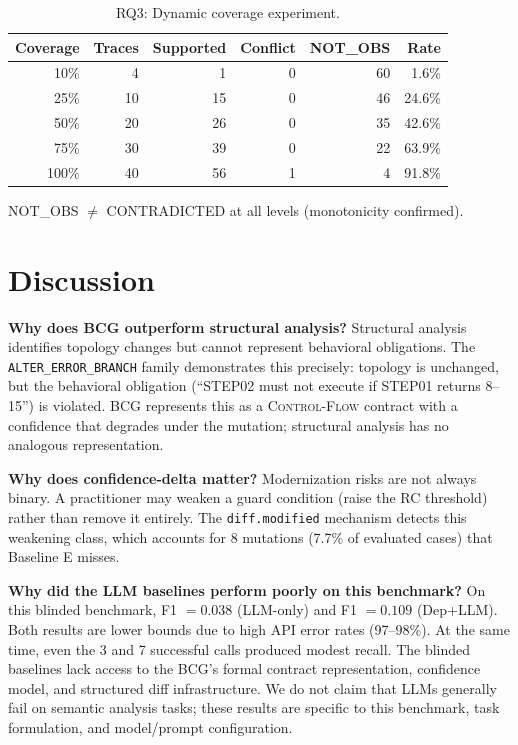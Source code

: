 \documentclass[sigconf,anonymous,review]{acmart}
\newcommand{\bcg}{\textsc{BCG}\xspace}
\begin{document}
\begin{table}[t]
\small\centering
\caption{RQ3: Dynamic coverage experiment.}\label{table:coverage}
\begin{tabular}{rrrrrr}
\toprule
Coverage & Traces & Supported & Conflict & NOT\_OBS & Rate \\
\midrule
10\%  & 4  & 1  & 0 & 60 & 1.6\%  \\
25\%  & 10 & 15 & 0 & 46 & 24.6\% \\
50\%  & 20 & 26 & 0 & 35 & 42.6\% \\
75\%  & 30 & 39 & 0 & 22 & 63.9\% \\
100\% & 40 & 56 & 1 & 4  & 91.8\% \\
\bottomrule
\end{tabular}
{\small NOT\_OBS $\neq$ CONTRADICTED at all levels (monotonicity confirmed).}
\end{table}

\section{Discussion}\label{sec:discussion}

\textbf{Why does BCG outperform structural analysis?}
Structural analysis identifies topology changes but cannot represent behavioral
obligations.
The \texttt{ALTER\_ERROR\_BRANCH} family demonstrates this precisely: topology is
unchanged, but the behavioral obligation (``STEP02 must not execute if STEP01 returns
8--15'') is violated.
\bcg represents this as a \textsc{Control-Flow} contract with a confidence that
degrades under the mutation; structural analysis has no analogous representation.

\textbf{Why does confidence-delta matter?}
Modernization risks are not always binary.
A practitioner may weaken a guard condition (raise the RC threshold) rather than
remove it entirely.
The \texttt{diff.modified} mechanism detects this weakening class, which accounts for
8 mutations (7.7\% of evaluated cases) that Baseline E misses.

\textbf{Why did the LLM baselines perform poorly on this benchmark?}
On this blinded benchmark, F1 $= 0.038$ (LLM-only) and F1 $= 0.109$ (Dep+LLM).
Both results are lower bounds due to high API error rates (97--98\%).
At the same time, even the 3 and 7 successful calls produced modest recall.
The blinded baselines lack access to the BCG's formal contract representation,
confidence model, and structured diff infrastructure.
We do not claim that LLMs generally fail on semantic analysis tasks; these results
are specific to this benchmark, task formulation, and model/prompt configuration.
\end{document}

